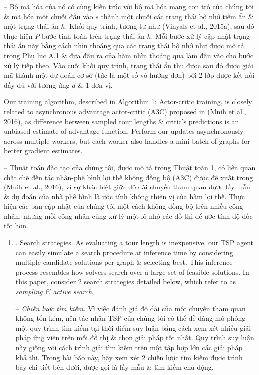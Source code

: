 \documentclass{article}
\begin{document}
\begin{itemize}
    -- Bộ mã hóa của nó có cùng kiến trúc với bộ mã hóa mạng con trỏ của chúng tôi \& mã hóa một chuỗi đầu vào $s$ thành một chuỗi các trạng thái bộ nhớ tiềm ẩn \& một trạng thái ẩn $h$. Khối quy trình, tương tự như (Vinyals et al., 2015a), sau đó thực hiện $P$ bước tính toán trên trạng thái ẩn $h$. Mỗi bước xử lý cập nhật trạng thái ẩn này bằng cách nhìn thoáng qua các trạng thái bộ nhớ như được mô tả trong Phụ lục A.1 \& đưa đầu ra của hàm nhìn thoáng qua làm đầu vào cho bước xử lý tiếp theo. Vào cuối khối quy trình, trạng thái ẩn thu được sau đó được giải mã thành một dự đoán cơ sở (tức là một số vô hướng đơn) bởi 2 lớp được kết nối đầy đủ với tương ứng $d$ \& 1 đơn vị.
    
    Our training algorithm, described in {\sf Algorithm 1: Actor-critic training}, is closely related to asynchronous advantage actor-critic (A3C) proposed in (Mnih et al., 2016), as difference between sampled tour lengths \& critic's predictions is an unbiased estimate of advantage function. Perform our updates asynchronously across multiple workers, but each worker also handles a mini-batch of graphs for better gradient estimates.
    
    -- Thuật toán đào tạo của chúng tôi, được mô tả trong Thuật toán 1, có liên quan chặt chẽ đến tác nhân-phê bình lợi thế không đồng bộ (A3C) được đề xuất trong (Mnih et al., 2016), vì sự khác biệt giữa độ dài chuyến tham quan được lấy mẫu \& dự đoán của nhà phê bình là ước tính không thiên vị của hàm lợi thế. Thực hiện các bản cập nhật của chúng tôi một cách không đồng bộ trên nhiều công nhân, nhưng mỗi công nhân cũng xử lý một lô nhỏ các đồ thị để ước tính độ dốc tốt hơn.
    \begin{enumerate}
        \item {. Search strategies.} As evaluating a tour length is inexpensive, our TSP agent can easily simulate a search procedure at inference time by considering multiple candidate solutions per graph \& selecting best. This inference process resembles how solvers search over a large set of feasible solutions. In this paper, consider 2 search strategies detailed below, which refer to as {\it sampling \& active search}.
        
        -- {\it Chiến lược tìm kiếm.} Vì việc đánh giá độ dài của một chuyến tham quan không tốn kém, nên tác nhân TSP của chúng tôi có thể dễ dàng mô phỏng một quy trình tìm kiếm tại thời điểm suy luận bằng cách xem xét nhiều giải pháp ứng viên trên mỗi đồ thị \& chọn giải pháp tốt nhất. Quy trình suy luận này giống với cách trình giải tìm kiếm trên một tập hợp lớn các giải pháp khả thi. Trong bài báo này, hãy xem xét 2 chiến lược tìm kiếm được trình bày chi tiết bên dưới, được gọi là lấy mẫu \& tìm kiếm chủ động.
        

\end{enumerate}
\end{itemize}
\end{document}
